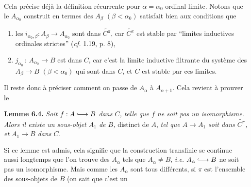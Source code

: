 \documentclass[11pt]{article}
\newcommand{\msp}[1]{\marginpar{\footnotesize [#1]}}
\newcommand{\into}{\lhook\joinrel\longrightarrow}
\begin{document}
\msp{page 79}
Cela précise déjà la définition récurrente pour $\alpha = \alpha_{0}$ ordinal limite. Notons que le $A_{\alpha_{0}}$ construit en termes des $A_{\beta}$ $(\beta < \alpha_{0})$ satisfait bien aux conditions que
\begin{enumerate}[label={}]
\item[\textit{a})] les $i_{\alpha_{0},\beta} : A_{\beta} \longrightarrow A_{\alpha_{0}}$ sont dans $\widetilde{C^{\pi}}$, car $\widetilde{C^{\pi}}$ est stable par ``limites inductives ordinales strictes'' (\textit{cf.} 1.19, p. 8),
\item[\textit{b})] $j_{\alpha_{0}} \, : \, A_{\alpha_{0}} \longrightarrow B$ est dans $C$, car c'est la limite inductive filtrante du système des $A_{\beta} \longrightarrow B$ $(\beta < \alpha_{0})$ qui sont dans $C$, et $C$ est stable par ces limites.
\end{enumerate}
Il reste donc à préciser comment on passe de $A_{\alpha}$ à $A_{\alpha+1}$. Cela revient à prouver le

\textbf{Lemme 6.4.} \textit{Soit $f : A \into B$ dans $C$, telle que $f$ ne soit pas un isomorphisme. Alors il existe un sous-objet $A_{1}$ de $B$,} distinct de $A$, \textit{tel que $A \longrightarrow A_{1}$ soit dans $\widetilde{C^{\pi}}$, et $A_{1} \longrightarrow B$ dans $C$.}

Si ce lemme est admis, cela signifie que la construction transfinie se continue aussi longtemps que l'on trouve des $A_{\alpha}$ tels que $A_{\alpha} \neq B$, \textit{i.e.} $A_{\alpha} \into B$ ne soit pas un isomorphisme. Mais comme les $A_{\alpha}$ sont tous différents, si $\pi$ est l'ensemble des sous-objets de $B$ (on sait que c'est un
\end{document}
